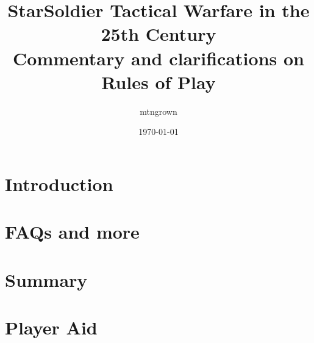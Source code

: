 \documentclass[10pt]{article}
\title{StarSoldier Tactical Warfare in the 25th Century\\
\vspace{2 mm} {\Large Commentary and clarifications on Rules of Play}}
\date{\today}
\author{mtngrown}
\begin{document}
\maketitle

\tableofcontents

\begin{multicols}{2}

\section{Introduction}

\section{FAQs and more}

\section{Summary}

\end{multicols}

\section*{Player Aid}
\end{document}
